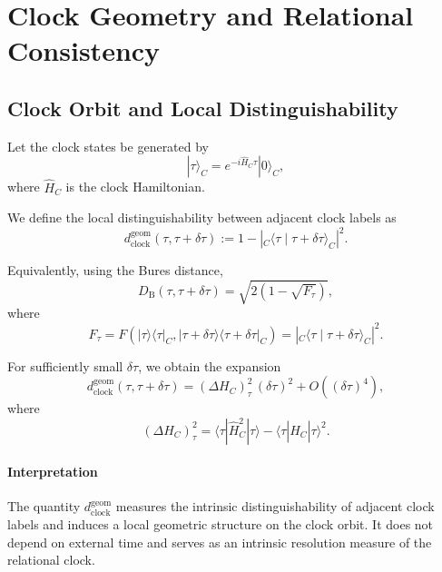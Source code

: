 \documentclass[11pt,a4paper]{article}
\theoremstyle{definition}
\theoremstyle{remark}
\begin{document}
\section{Clock Geometry and Relational Consistency}

\subsection{Clock Orbit and Local Distinguishability}

Let the clock states be generated by
\begin{equation}
|\tau\rangle_C = e^{-i\hat{H}_C \tau} |0\rangle_C,
\end{equation}
where $\hat{H}_C$ is the clock Hamiltonian.

We define the local distinguishability between adjacent clock labels as
\begin{equation}
d_{\mathrm{clock}}^{\mathrm{geom}}(\tau,\tau+\delta\tau)
:=
1 - \left| {}_C\langle \tau \mid \tau+\delta\tau \rangle_C \right|^2.
\end{equation}

Equivalently, using the Bures distance,
\begin{equation}
D_{\mathrm{B}}(\tau,\tau+\delta\tau)
=
\sqrt{2\left(1 - \sqrt{F_\tau}\right)},
\end{equation}
where
\begin{equation}
F_\tau
=
F\!\left(
|\tau\rangle\langle\tau|_C,
|\tau+\delta\tau\rangle\langle\tau+\delta\tau|_C
\right)
=
\left| {}_C\langle \tau \mid \tau+\delta\tau \rangle_C \right|^2.
\end{equation}

For sufficiently small $\delta\tau$, we obtain the expansion
\begin{equation}
d_{\mathrm{clock}}^{\mathrm{geom}}(\tau,\tau+\delta\tau)
=
(\Delta H_C)^2_\tau\,(\delta\tau)^2
+ O\!\left((\delta\tau)^4\right),
\end{equation}
where
\begin{equation}
(\Delta H_C)^2_\tau
=
\langle \tau | \hat{H}_C^2 | \tau \rangle
-
\langle \tau | \hat{H}_C | \tau \rangle^2.
\end{equation}

\paragraph{Interpretation}
The quantity $d_{\mathrm{clock}}^{\mathrm{geom}}$ measures the intrinsic distinguishability of adjacent clock labels and induces a local geometric structure on the clock orbit. It does not depend on external time and serves as an intrinsic resolution measure of the relational clock.
\end{document}
